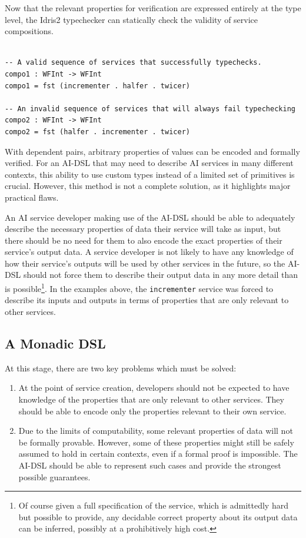 \documentclass[]{report}
\begin{document}
Now that the relevant properties for verification are expressed entirely at the
type level, the Idris2 typechecker can statically check the validity of service
compositions.

\begin{verbatim}

-- A valid sequence of services that successfully typechecks.
compo1 : WFInt -> WFInt
compo1 = fst (incrementer . halfer . twicer)

-- An invalid sequence of services that will always fail typechecking
compo2 : WFInt -> WFInt
compo2 = fst (halfer . incrementer . twicer)
\end{verbatim}

With dependent pairs, arbitrary properties of values can be encoded and formally
verified.  For an AI-DSL that may need to describe AI services in many different
contexts, this ability to use custom types instead of a limited set of
primitives is crucial.  However, this method is not a complete solution, as it
highlights major practical flaws.

An AI service developer making use of the AI-DSL should be able to adequately
describe the necessary properties of data their service will take as input, but
there should be no need for them to also encode the exact properties of their
service's output data.  A service developer is not likely to have any knowledge
of how their service's outputs will be used by other services in the future, so
the AI-DSL should not force them to describe their output data in any more
detail than is possible\footnote{Of course given a full specification
of the service, which is admittedly hard but possible to provide, any
decidable correct property about its output data can be inferred,
possibly at a prohibitively high cost.}.  In the examples above,
the \texttt{incrementer} service was forced to describe its inputs and
outputs in terms of properties that are only relevant to other
services.


\subsection{A Monadic DSL}

At this stage, there are two key problems which must be solved:

\begin{enumerate}

  \item At the point of service creation, developers should not be expected to
        have knowledge of the properties that are only relevant to other
        services.  They should be able to encode only the properties relevant to
        their own service.

  \item Due to the limits of computability, some relevant properties of data
        will not be formally provable.  However, some of these properties might
        still be safely assumed to hold in certain contexts, even if a formal
        proof is impossible.  The AI-DSL should be able to represent such cases
        and provide the strongest possible guarantees.

\end{enumerate}
\end{document}
